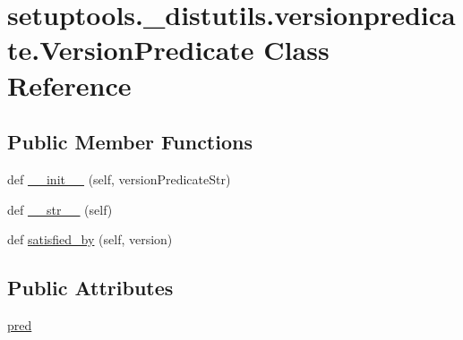 \hypertarget{classsetuptools_1_1__distutils_1_1versionpredicate_1_1VersionPredicate}{}\section{setuptools.\+\_\+distutils.\+versionpredicate.\+Version\+Predicate Class Reference}
\label{classsetuptools_1_1__distutils_1_1versionpredicate_1_1VersionPredicate}
\subsection*{Public Member Functions}
\begin{DoxyCompactItemize}
\item 
def \hyperlink{classsetuptools_1_1__distutils_1_1versionpredicate_1_1VersionPredicate_a50b7ef93717276fd4d7ea45efe206b1f}{\+\_\+\+\_\+init\+\_\+\+\_\+} (self, version\+Predicate\+Str)
\item 
def \hyperlink{classsetuptools_1_1__distutils_1_1versionpredicate_1_1VersionPredicate_abd1b824f167ab2c1b646159d1d3539f1}{\+\_\+\+\_\+str\+\_\+\+\_\+} (self)
\item 
def \hyperlink{classsetuptools_1_1__distutils_1_1versionpredicate_1_1VersionPredicate_a442d0bef67f5d943e1e7f216666bea67}{satisfied\+\_\+by} (self, version)
\end{DoxyCompactItemize}
\subsection*{Public Attributes}
\begin{DoxyCompactItemize}
\item 
\hyperlink{classsetuptools_1_1__distutils_1_1versionpredicate_1_1VersionPredicate_a2ad2261c1f41e2ca1bcc9ea5a22f2ff7}{pred}
\end{DoxyCompactItemize}



